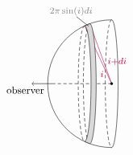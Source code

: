 \documentclass[10pt]{article}
\begin{document}
\[\begin{tikzpicture}
  \coordinate (O) at (0,0);


  \draw[black] (0,2cm) arc [start angle = 90, end angle = 270,
    x radius = 2cm, y radius = 2cm];
  \draw[densely dashed] (0cm,2cm) arc [start angle = 90, end angle = 270,
    x radius = 2mm, y radius = 2cm];
  \draw (0cm,2cm) arc [start angle = 90, end angle = -90,
    x radius = 2mm, y radius = 2cm];

  \draw [purple] (O) to (110:2cm) node at (.17,.7) {\footnotesize $i$+$di$}; 
  \draw [purple] (O) to (115:2cm) node at (-.3,.3) {\footnotesize $i$}; 

  
  \draw[densely dashed] (O) -- (-1.8cm,0);
  \draw [->] (O)++(-1.8cm,0) -- (-2.5cm,0) node at (-2.7,-.2)  {\small observer};

  
  \filldraw (O) circle (1pt);

  \draw[densely dashed] (O) ++ (110:2cm) arc [start angle = 90, end angle = 270,
    x radius = 2mm, y radius = 2cm*sin(110)];
  \draw[densely dashed] (O) ++ (115:2cm) arc [start angle = 90, end angle = 270,
    x radius = 2mm, y radius = 2cm*sin(115)];

  \draw [fill = gray!30] (O) ++ (110:2cm) arc [start angle = 90, end angle = -90,
    x radius = 2mm, y radius = 2cm*sin(110)]
    arc [start angle = -110, end angle = -115,
    x radius = 2cm, y radius = 2cm]
    arc [start angle = -90, end angle = 90,
    x radius = 2mm, y radius = 2cm*sin(115)]
    arc [start angle = 115, end angle = 110,
    x radius = 2cm, y radius = 2cm];

  \draw (-1.1,2.1) -- (-0.72,1.8) node at (-1.27,2.27) [gray] {\footnotesize $2\pi\sin(i)di$};


\end{tikzpicture}
\]
\end{document}
